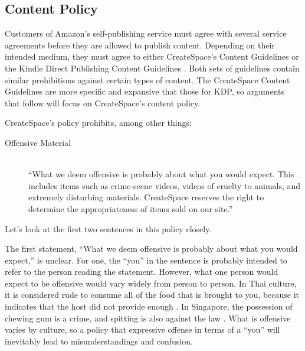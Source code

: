 \documentclass[11pt]{article}
\begin{document}
\begin{multicols}{2}
\subsection{Content Policy}

Customers of Amazon's self-publishing service must agree with several service agreements before they are allowed to publish content.  Depending on their intended medium, they must agree to either CreateSpace's Content Guidelines \cite{CreateSpaceContentGuidelines} or the Kindle Direct Publishing Content Guidelines \cite{AmazonKDPContentGuidelines}.  Both sets of guidelines contain similar prohibitions against certain types of content.  The CreateSpace Content Guidelines are more specific and expansive that those for KDP, so arguments that follow will focus on CreateSpace's content policy.

CreateSpace's policy prohibits, among other things:

\begin{description}
\item[Offensive Material] \hfill \\
      ``What we deem offensive is probably about what you would expect. This includes items such as crime-scene videos, videos of cruelty to animals, and extremely disturbing materials. CreateSpace reserves the right to determine the appropriateness of items sold on our site.''

\end{description}

Let's look at the first two sentences in this policy closely.

The first statement, ``What we deem offensive is probably about what you would expect,'' is unclear.  For one, the ``you'' in the sentence is probably intended to refer to the person reading the statement.  However, what one person would expect to be offensive would vary widely from person to person.  In Thai culture, it is considered rude to consume all of the food that is brought to you, because it indicates that the host did not provide enough \cite{EHowThai}.  In Singapore, the possession of chewing gum is a crime, and spitting is also against the law \cite{HotelTravelSingapore}.  What is offensive varies by culture, so a policy that expressive offense in terms of a ``you'' will inevitably lead to misunderstandings and confusion.


\end{multicols}
\end{document}
